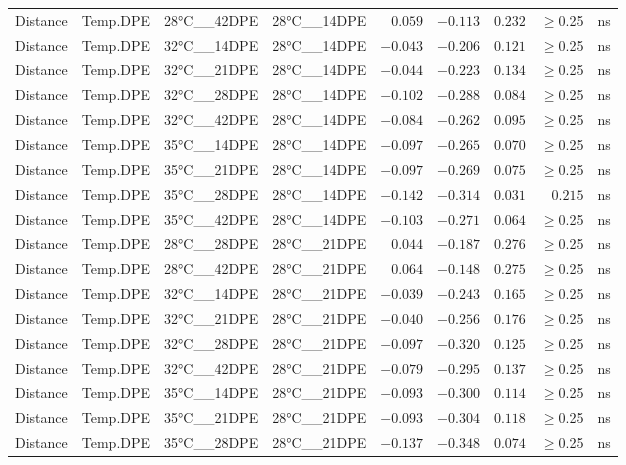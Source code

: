 \documentclass[
]{article}
\begin{document}
\begin{longtable}{llllrrrrl}
Distance & Temp.DPE & 28°C\_\_42DPE & 28°C\_\_14DPE & $0.059$ & $-0.113$ & $0.232$ & $\geq$0.25 & ns \\ 
Distance & Temp.DPE & 32°C\_\_14DPE & 28°C\_\_14DPE & $-0.043$ & $-0.206$ & $0.121$ & $\geq$0.25 & ns \\ 
Distance & Temp.DPE & 32°C\_\_21DPE & 28°C\_\_14DPE & $-0.044$ & $-0.223$ & $0.134$ & $\geq$0.25 & ns \\ 
Distance & Temp.DPE & 32°C\_\_28DPE & 28°C\_\_14DPE & $-0.102$ & $-0.288$ & $0.084$ & $\geq$0.25 & ns \\ 
Distance & Temp.DPE & 32°C\_\_42DPE & 28°C\_\_14DPE & $-0.084$ & $-0.262$ & $0.095$ & $\geq$0.25 & ns \\ 
Distance & Temp.DPE & 35°C\_\_14DPE & 28°C\_\_14DPE & $-0.097$ & $-0.265$ & $0.070$ & $\geq$0.25 & ns \\ 
Distance & Temp.DPE & 35°C\_\_21DPE & 28°C\_\_14DPE & $-0.097$ & $-0.269$ & $0.075$ & $\geq$0.25 & ns \\ 
Distance & Temp.DPE & 35°C\_\_28DPE & 28°C\_\_14DPE & $-0.142$ & $-0.314$ & $0.031$ & $0.215$ & ns \\ 
Distance & Temp.DPE & 35°C\_\_42DPE & 28°C\_\_14DPE & $-0.103$ & $-0.271$ & $0.064$ & $\geq$0.25 & ns \\ 
Distance & Temp.DPE & 28°C\_\_28DPE & 28°C\_\_21DPE & $0.044$ & $-0.187$ & $0.276$ & $\geq$0.25 & ns \\ 
Distance & Temp.DPE & 28°C\_\_42DPE & 28°C\_\_21DPE & $0.064$ & $-0.148$ & $0.275$ & $\geq$0.25 & ns \\ 
Distance & Temp.DPE & 32°C\_\_14DPE & 28°C\_\_21DPE & $-0.039$ & $-0.243$ & $0.165$ & $\geq$0.25 & ns \\ 
Distance & Temp.DPE & 32°C\_\_21DPE & 28°C\_\_21DPE & $-0.040$ & $-0.256$ & $0.176$ & $\geq$0.25 & ns \\ 
Distance & Temp.DPE & 32°C\_\_28DPE & 28°C\_\_21DPE & $-0.097$ & $-0.320$ & $0.125$ & $\geq$0.25 & ns \\ 
Distance & Temp.DPE & 32°C\_\_42DPE & 28°C\_\_21DPE & $-0.079$ & $-0.295$ & $0.137$ & $\geq$0.25 & ns \\ 
Distance & Temp.DPE & 35°C\_\_14DPE & 28°C\_\_21DPE & $-0.093$ & $-0.300$ & $0.114$ & $\geq$0.25 & ns \\ 
Distance & Temp.DPE & 35°C\_\_21DPE & 28°C\_\_21DPE & $-0.093$ & $-0.304$ & $0.118$ & $\geq$0.25 & ns \\ 
Distance & Temp.DPE & 35°C\_\_28DPE & 28°C\_\_21DPE & $-0.137$ & $-0.348$ & $0.074$ & $\geq$0.25 & ns \\ 

\end{longtable}
\end{document}
